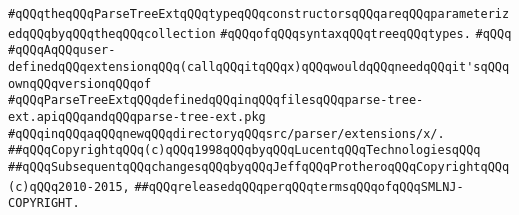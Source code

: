 \verb|#qQQqtheqQQqParseTreeExtqQQqtypeqQQqconstructorsqQQqareqQQqparameterizedqQQqbyqQQqtheqQQqcollection|\newline
\verb|#qQQqofqQQqsyntaxqQQqtreeqQQqtypes.|\newline
\verb|#qQQq|\newline
\verb|#qQQqAqQQquser-definedqQQqextensionqQQq(callqQQqitqQQqx)qQQqwouldqQQqneedqQQqit'sqQQqownqQQqversionqQQqof|\newline
\verb|#qQQqParseTreeExtqQQqdefinedqQQqinqQQqfilesqQQqparse-tree-ext.apiqQQqandqQQqparse-tree-ext.pkg|\newline
\verb|#qQQqinqQQqaqQQqnewqQQqdirectoryqQQqsrc/parser/extensions/x/.|\newline
\newline
\newline
\newline
\verb|##qQQqCopyrightqQQq(c)qQQq1998qQQqbyqQQqLucentqQQqTechnologiesqQQq|\newline
\verb|##qQQqSubsequentqQQqchangesqQQqbyqQQqJeffqQQqProtheroqQQqCopyrightqQQq(c)qQQq2010-2015,|\newline
\verb|##qQQqreleasedqQQqperqQQqtermsqQQqofqQQqSMLNJ-COPYRIGHT.|\newline

